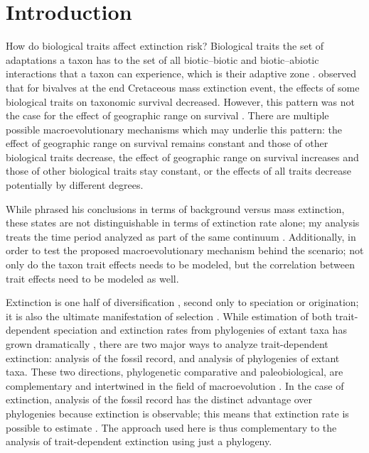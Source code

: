 \documentclass{article}
\begin{document}
\section{Introduction}

How do biological traits affect extinction risk? Biological traits the set of adaptations a taxon has to the set of all biotic--biotic and biotic--abiotic interactions that a taxon can experience, which is their adaptive zone \citep{Simpson1944}. \citet{Jablonski1986} observed that for bivalves at the end Cretaceous mass extinction event, the effects of some biological traits on taxonomic survival decreased. However, this pattern was not the case for the effect of geographic range on survival \citep{Jablonski1986,Payne2007}. There are multiple possible macroevolutionary mechanisms which may underlie this pattern: the effect of geographic range on survival remains constant and those of other biological traits decrease, the effect of geographic range on survival increases and those of other biological traits stay constant, or the effects of all traits decrease potentially by different degrees.

While \citet{Jablonski1986} phrased his conclusions in terms of background versus mass extinction, these states are not distinguishable in terms of extinction rate alone; my analysis treats the time period analyzed as part of the same continuum \citep{Wang2003,Payne2007,Simpson2009}. Additionally, in order to test the proposed macroevolutionary mechanism behind the \citet{Jablonski1986} scenario; not only do the taxon trait effects needs to be modeled, but the correlation between trait effects need to be modeled as well. 

Extinction is one half of diversification \citep{Stanley1979,Stanley1975}, second only to speciation or origination; it is also the ultimate manifestation of selection \citep{Simpson1944}. While estimation of both trait-dependent speciation and extinction rates from phylogenies of extant taxa has grown dramatically \citep{Maddison2007,Fitzjohn2010,Goldberg2011a,Goldberg2005,Rabosky2013,Stadler2013b,Stadler2011a,Stadler2013a}, there are two major ways to analyze trait-dependent extinction: analysis of the fossil record, and analysis of phylogenies of extant taxa.  These two directions, phylogenetic comparative and paleobiological, are complementary and intertwined in the field of macroevolution \citep{Rabosky2010b,Jablonski2008a,Hunt2014a}. In the case of extinction, analysis of the fossil record has the distinct advantage over phylogenies because extinction is observable; this means that extinction rate is possible to estimate \citep{Rabosky2010a,Quental2009,Liow2010a}. The approach used here is thus complementary to the analysis of trait-dependent extinction using just a phylogeny.
\end{document}
